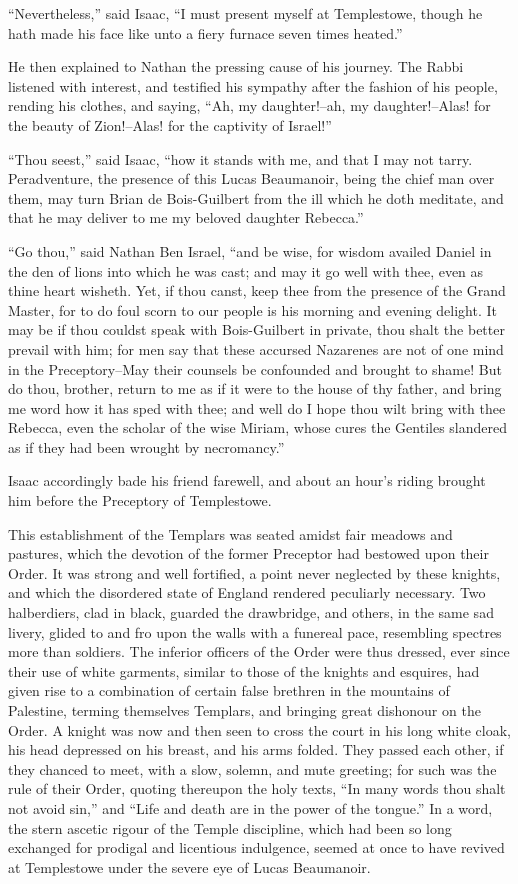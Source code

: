 ``Nevertheless,'' said Isaac, ``I must present myself at Templestowe,
though he hath made his face like unto a fiery furnace seven times
heated.''

He then explained to Nathan the pressing cause of his journey. The Rabbi
listened with interest, and testified his sympathy after the fashion of
his people, rending his clothes, and saying, ``Ah, my daughter!--ah, my
daughter!--Alas! for the beauty of Zion!--Alas! for the captivity of
Israel!''

``Thou seest,'' said Isaac, ``how it stands with me, and that I may not
tarry. Peradventure, the presence of this Lucas Beaumanoir, being the
chief man over them, may turn Brian de Bois-Guilbert from the ill which
he doth meditate, and that he may deliver to me my beloved daughter
Rebecca.''

``Go thou,'' said Nathan Ben Israel, ``and be wise, for wisdom availed
Daniel in the den of lions into which he was cast; and may it go well
with thee, even as thine heart wisheth. Yet, if thou canst, keep thee
from the presence of the Grand Master, for to do foul scorn to our
people is his morning and evening delight. It may be if thou couldst
speak with Bois-Guilbert in private, thou shalt the better prevail with
him; for men say that these accursed Nazarenes are not of one mind in
the Preceptory--May their counsels be confounded and brought to shame!
But do thou, brother, return to me as if it were to the house of thy
father, and bring me word how it has sped with thee; and well do I hope
thou wilt bring with thee Rebecca, even the scholar of the wise Miriam,
whose cures the Gentiles slandered as if they had been wrought by
necromancy.''

Isaac accordingly bade his friend farewell, and about an hour's riding
brought him before the Preceptory of Templestowe.

This establishment of the Templars was seated amidst fair meadows and
pastures, which the devotion of the former Preceptor had bestowed upon
their Order. It was strong and well fortified, a point never neglected
by these knights, and which the disordered state of England rendered
peculiarly necessary. Two halberdiers, clad in black, guarded the
drawbridge, and others, in the same sad livery, glided to and fro upon
the walls with a funereal pace, resembling spectres more than soldiers.
The inferior officers of the Order were thus dressed, ever since their
use of white garments, similar to those of the knights and esquires, had
given rise to a combination of certain false brethren in the mountains
of Palestine, terming themselves Templars, and bringing great dishonour
on the Order. A knight was now and then seen to cross the court in his
long white cloak, his head depressed on his breast, and his arms folded.
They passed each other, if they chanced to meet, with a slow, solemn,
and mute greeting; for such was the rule of their Order, quoting
thereupon the holy texts, ``In many words thou shalt not avoid sin,''
and ``Life and death are in the power of the tongue.'' In a word, the
stern ascetic rigour of the Temple discipline, which had been so long
exchanged for prodigal and licentious indulgence, seemed at once to have
revived at Templestowe under the severe eye of Lucas Beaumanoir.

